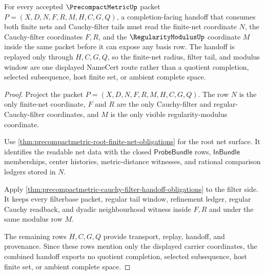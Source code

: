 \begin{theorem}
\label{thm:precompactmetric-filter-net-modulus-handoff}
For every accepted $\PrecompactMetricUp$ packet $P=(X,D,N,F,R,M,H,C,G,Q)$, a completion-facing handoff that consumes both finite nets and Cauchy-filter tails must read the finite-net coordinate $N$, the Cauchy-filter coordinates $F,R$, and the $\RegularityModulusUp$ coordinate $M$ inside the same packet before it can expose any basis row. The handoff is replayed only through $H,C,G,Q$, so the finite-net radius, filter tail, and modulus window are one displayed NameCert route rather than a quotient completion, selected subsequence, host finite set, or ambient complete space.
\end{theorem}
\begin{proof}
Project the packet $P=(X,D,N,F,R,M,H,C,G,Q)$. The row $N$ is the only finite-net coordinate, $F$ and $R$ are the only Cauchy-filter and regular-Cauchy-filter coordinates, and $M$ is the only visible regularity-modulus coordinate.

Use \autoref{thm:precompactmetric-root-finite-net-obligations} for the root net surface. It identifies the readable net data with the closed $\mathsf{ProbeBundle}$ rows, $\mathsf{InBundle}$ memberships, center histories, metric-distance witnesses, and rational comparison ledgers stored in $N$.

Apply \autoref{thm:precompactmetric-cauchy-filter-handoff-obligations} to the filter side. It keeps every filterbase packet, regular tail window, refinement ledger, regular Cauchy readback, and dyadic neighbourhood witness inside $F,R$ and under the same modulus row $M$.

The remaining rows $H,C,G,Q$ provide transport, replay, handoff, and provenance. Since these rows mention only the displayed carrier coordinates, the combined handoff exports no quotient completion, selected subsequence, host finite set, or ambient complete space.
\end{proof}

